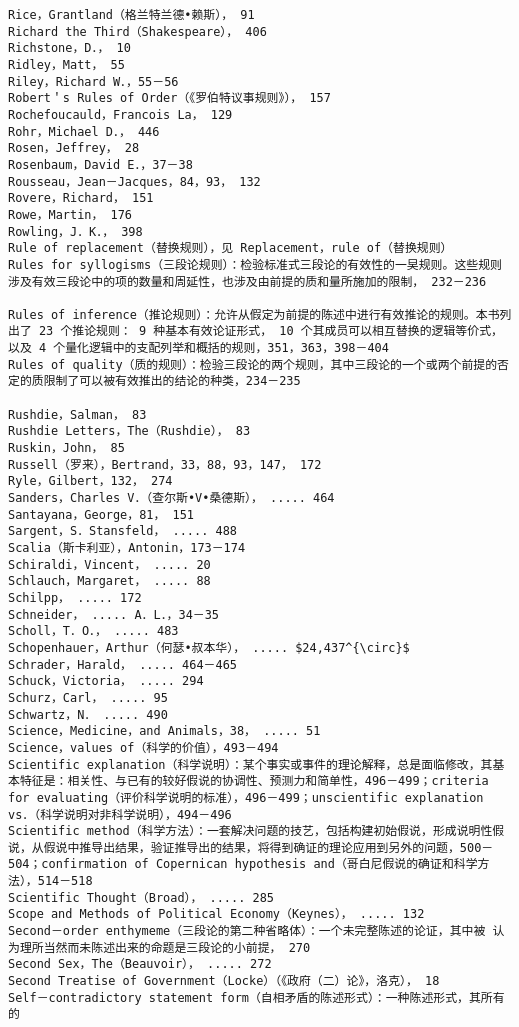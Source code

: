 \begin{verbatim}
Rice，Grantland（格兰特兰德•赖斯）， 91
Richard the Third（Shakespeare）， 406
Richstone，D．， 10
Ridley，Matt， 55
Riley，Richard W．，55－56
Robert＇s Rules of Order（《罗伯特议事规则》）， 157
Rochefoucauld，Francois La， 129
Rohr，Michael D．， 446
Rosen，Jeffrey， 28
Rosenbaum，David E．，37－38
Rousseau，Jean－Jacques，84，93， 132
Rovere，Richard， 151
Rowe，Martin， 176
Rowling，J．K．， 398
Rule of replacement（替换规则），见 Replacement，rule of（替换规则）
Rules for syllogisms（三段论规则）：检验标准式三段论的有效性的一旲规则。这些规则涉及有效三段论中的项的数量和周延性，也涉及由前提的质和量所施加的限制， 232－236

Rules of inference（推论规则）：允许从假定为前提的陈述中进行有效推论的规则。本书列出了 23 个推论规则： 9 种基本有效论证形式， 10 个其成员可以相互替换的逻辑等价式，以及 4 个量化逻辑中的支配列举和概括的规则，351，363，398－404
Rules of quality（质的规则）：检验三段论的两个规则，其中三段论的一个或两个前提的否定的质限制了可以被有效推出的结论的种类，234－235

Rushdie，Salman， 83
Rushdie Letters，The（Rushdie）， 83
Ruskin，John， 85
Russell（罗来），Bertrand，33，88，93，147， 172
Ryle，Gilbert，132， 274
Sanders，Charles V．（查尔斯•V•桑德斯）， ..... 464
Santayana，George，81， 151
Sargent，S．Stansfeld， ..... 488
Scalia（斯卡利亚），Antonin，173－174
Schiraldi，Vincent， ..... 20
Schlauch，Margaret， ..... 88
Schilpp， ..... 172
Schneider， ..... A．L．，34－35
Scholl，T．O．， ..... 483
Schopenhauer，Arthur（何瑟•叔本华）， ..... $24,437^{\circ}$
Schrader，Harald， ..... 464－465
Schuck，Victoria， ..... 294
Schurz，Carl， ..... 95
Schwartz，N． ..... 490
Science，Medicine，and Animals，38， ..... 51
Science，values of（科学的价值），493－494
Scientific explanation（科学说明）：某个事实或事件的理论解释，总是面临修改，其基本特征是：相关性、与已有的较好假说的协调性、预测力和简单性，496－499；criteria for evaluating（评价科学说明的标准），496－499；unscientific explanation vs．（科学说明对非科学说明），494－496
Scientific method（科学方法）：一套解决问题的技艺，包括构建初始假说，形成说明性假说，从假说中推导出结果，验证推导出的结果，将得到确证的理论应用到另外的问题，500－504；confirmation of Copernican hypothesis and（哥白尼假说的确证和科学方法），514－518
Scientific Thought（Broad）， ..... 285
Scope and Methods of Political Economy（Keynes）， ..... 132
Second－order enthymeme（三段论的第二种省略体）：一个未完整陈述的论证，其中被 认为理所当然而未陈述出来的命题是三段论的小前提， 270
Second Sex，The（Beauvoir）， ..... 272
Second Treatise of Government（Locke）（《政府（二）论》，洛克）， 18
Self－contradictory statement form（自相矛盾的陈述形式）：一种陈述形式，其所有的


\end{verbatim}
